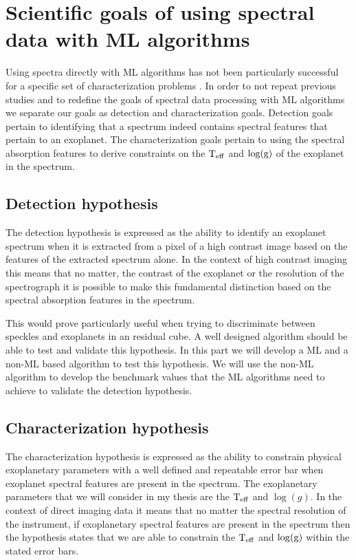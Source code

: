 \section{Scientific goals of using spectral data with ML algorithms}
Using spectra directly with ML algorithms has not been particularly successful for a specific set of characterization problems \citep[e.g,][]{2020Fisher}.
In order to not repeat previous studies and to redefine the goals of spectral data processing with ML algorithms we separate our goals as detection and characterization goals.
Detection goals pertain to identifying that a spectrum indeed contains spectral features that pertain to an exoplanet.
The characterization goals pertain to using the spectral absorption features to derive constraints on the $\rm{T_{eff}}$ and $\log(\rm{g})$ of the exoplanet in the spectrum.
\subsection{Detection hypothesis}
The detection hypothesis is expressed as the ability to identify an exoplanet spectrum when it is extracted from a pixel of a high contrast image based on the features of the extracted spectrum alone.
In the context of high contrast imaging this means that no matter, the contrast of the exoplanet or the resolution of the spectrograph it is possible to make this fundamental distinction based on the spectral absorption features in the spectrum.

This would prove particularly useful when trying to discriminate between speckles and exoplanets in an residual cube.
A well designed algorithm should be able to test and validate this hypothesis.
In this part we will develop a ML and a non-ML based algorithm to test this hypothesis.
We will use the non-ML algorithm to develop the benchmark values that the ML algorithms need to achieve to validate the detection hypothesis.

\subsection{Characterization hypothesis}
The characterization hypothesis is expressed as the ability to constrain physical exoplanetary parameters with a well defined and repeatable error bar when exoplanet spectral features are present in the spectrum.
The exoplanetary parameters that we will consider in my thesis are the $\rm{T_{eff}}$ and $\log(g)$.
In the context of direct imaging data it means that no matter the spectral resolution of the instrument, if exoplanetary spectral features are present in the spectrum then the hypothesis states that we are able to constrain the $\rm{T_{eff}}$ and $\log(\rm{g})$ within the stated error bars. 

